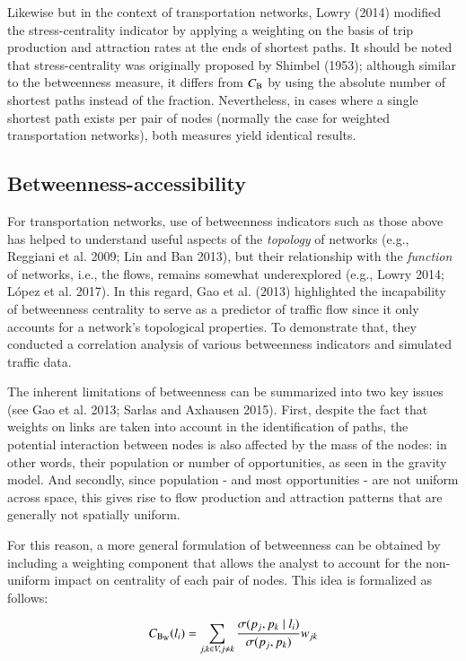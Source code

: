 \documentclass[]{elsarticle} %
\begin{document}
Likewise but in the context of transportation networks, Lowry (2014)
modified the stress-centrality indicator by applying a weighting on the
basis of trip production and attraction rates at the ends of shortest
paths. It should be noted that stress-centrality was originally proposed
by Shimbel (1953); although similar to the betweenness measure, it
differs from \(C_{\rm B}\) by using the absolute number of shortest
paths instead of the fraction. Nevertheless, in cases where a single
shortest path exists per pair of nodes (normally the case for weighted
transportation networks), both measures yield identical results.

\subsection{Betweenness-accessibility}\label{betweenness-accessibility}

For transportation networks, use of betweenness indicators such as those
above has helped to understand useful aspects of the \emph{topology} of
networks (e.g., Reggiani et al. 2009; Lin and Ban 2013), but their
relationship with the \emph{function} of networks, i.e., the flows,
remains somewhat underexplored (e.g., Lowry 2014; López et al. 2017). In
this regard, Gao et al. (2013) highlighted the incapability of
betweenness centrality to serve as a predictor of traffic flow since it
only accounts for a network's topological properties. To demonstrate
that, they conducted a correlation analysis of various betweenness
indicators and simulated traffic data.

The inherent limitations of betweenness can be summarized into two key
issues (see Gao et al. 2013; Sarlas and Axhausen 2015). First, despite
the fact that weights on links are taken into account in the
identification of paths, the potential interaction between nodes is also
affected by the mass of the nodes: in other words, their population or
number of opportunities, as seen in the gravity model. And secondly,
since population - and most opportunities - are not uniform across
space, this gives rise to flow production and attraction patterns that
are generally not spatially uniform.

For this reason, a more general formulation of betweenness can be
obtained by including a weighting component that allows the analyst to
account for the non-uniform impact on centrality of each pair of nodes.
This idea is formalized as follows:

\begin{equation}\label{f:btw_weight}
C_{\rm B_W}(l_i)=\sum\limits_{j,k \space \in V,j\neq k} \frac{{\sigma(p_j,p_k \mid l_i)}}{\sigma(p_j,p_k)}w_{jk}
\end{equation}
\end{document}
